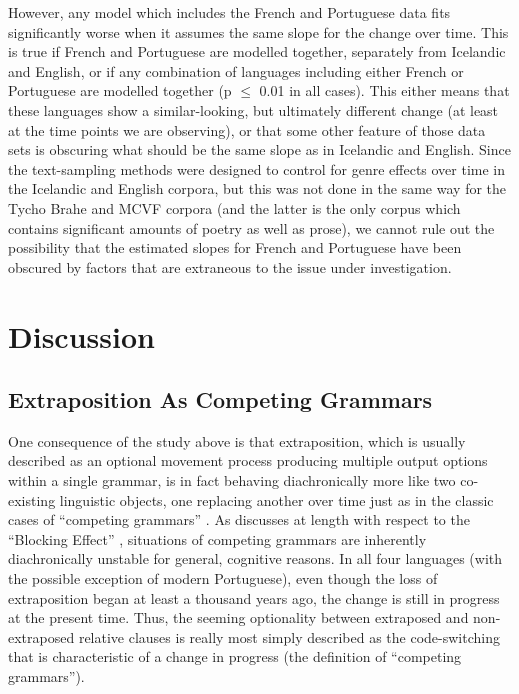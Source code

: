 However, any model which includes the French and Portuguese data fits significantly worse when it assumes the same slope for the change over time. This is true if French and Portuguese are modelled together, separately from Icelandic and English, or if any combination of languages including either French or Portuguese are modelled together (p $\leq$ 0.01 in all cases). This either means that these languages show a similar-looking, but ultimately different change (at least at the time points we are observing), or that some other feature of those data sets is obscuring what should be the same slope as in Icelandic and English. Since the text-sampling methods were designed to control for genre effects over time in the Icelandic and English corpora, but this was not done in the same way for the Tycho Brahe and MCVF corpora (and the latter is the only corpus which contains significant amounts of poetry as well as prose), we cannot rule out the possibility that the estimated slopes for French and Portuguese have been obscured by factors that are extraneous to the issue under investigation.



\section{Discussion}
\subsection{Extraposition As Competing Grammars}
\label{compete}

One consequence of the study above is that extraposition, which is usually described as an optional movement process producing multiple output options within a single grammar, is in fact behaving diachronically more like two co-existing linguistic objects, one replacing another over time just as in the classic cases of ``competing grammars'' \citep[][etc.]{kroch1989, kroch1994, santorini1992}. As \citet{kroch1994} discusses at length with respect to the ``Blocking Effect'' \citep[an expanded understanding of the principle first proposed in ]{aronoff1976}, situations of competing grammars are inherently diachronically unstable for general, cognitive reasons. In all four languages (with the possible exception of modern Portuguese), even though the loss of extraposition began at least a thousand years ago, the change is still in progress at the present time. Thus, the seeming optionality between extraposed and non-extraposed relative clauses is really most simply described as the code-switching that is characteristic of a change in progress (the definition of ``competing grammars'').

